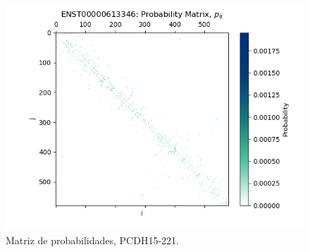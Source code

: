 \documentclass[a4paper,11pt,titlepage]{article}
\theoremstyle{definition}
\begin{document}
\begin{figure}[H]
    \hfill
    \begin{minipage}[c]{0.31\textwidth}
        \centering
        \includegraphics[width=\textwidth]{images/PCDH15-221-db_iter-matrix.png}
        \caption{Matriz de probabilidades, PCDH15-221.}
        \label{fig:PCDH15-221-matrix}
    \end{minipage}
\end{figure}
\end{document}
